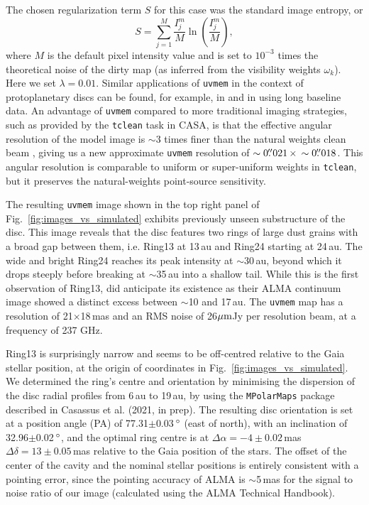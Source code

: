 \documentclass[fleqn,usenatbib,useAMS]{mnras}
\begin{document}
The chosen regularization term $S$ for this case was the standard image entropy, or
\begin{equation}
S = \sum_{j=1}^M \frac{I_j^m}{M} \ln\left(\frac{I_j^m}{M}\right),
\end{equation}
where $M$ is the default pixel intensity value and is set to $10^{-3}$ times the theoretical noise of the dirty map (as inferred from the visibility weights $\omega_k$). Here we set $\lambda = 0.01$. Similar applications of {\tt uvmem} in the context of protoplanetary discs can be found, for example, in \citet{Casassus2013Natur, 2018MNRAS.477.5104C, Casassus2019MNRAS.483.3278C,  Perez2019AJ....158...15P} and in \citet{2020ApJ...889L..24P} using long baseline data. An advantage of {\tt uvmem} compared to more traditional imaging strategies, such as provided by the  {\tt tclean} task in CASA, is that the effective angular resolution of the model image is $\sim$3 times finer than the natural weights clean beam \citep[][]{2018A&C....22...16C}, giving us a new approximate {\tt uvmem} resolution of $\sim0\hbox{$.\!\!^{\prime\prime}$}021 \,\times \,\sim0\hbox{$.\!\!^{\prime\prime}$}018$. This angular resolution is comparable to uniform or super-uniform weights in {\tt tclean}, but it preserves the natural-weights point-source sensitivity. 

The resulting {\tt uvmem} image shown in the top right panel of Fig.~\ref{fig:images_vs_simulated} exhibits previously unseen substructure of the disc. This image reveals that the disc features two rings of large dust grains with a broad gap between them, i.e. Ring13 at 13\,au and Ring24 starting at 24\,au. The wide and bright Ring24 reaches its peak intensity at $\sim$30\,au, beyond which it drops steeply before breaking at $\sim$35\,au into a shallow tail. While this is the first observation of Ring13, \citet{Ru_z_Rodr_guez_2019} did anticipate its existence as their ALMA continuum image showed a distinct excess between $\sim$10 and 17\,au. The {\tt uvmem} map has a resolution of 21$\times$18\,mas and an RMS noise of 26$\hbox{$\mu$m}$Jy per resolution beam, at a frequency of 237 GHz.  

Ring13 is surprisingly narrow and seems to be off-centred relative to the Gaia stellar position, at the origin of coordinates in Fig.~\ref{fig:images_vs_simulated}. We determined the ring's centre and orientation by minimising the dispersion of the disc radial profiles from 6\,au to 19\,au, by using the {\tt MPolarMaps} package described in Casassus et al. (2021, in prep). The resulting disc orientation is set at a position angle (PA) of 77.31$\pm$0.03\,$\hbox{$^\circ$}$ (east of north), with an  inclination of 32.96$\pm$0.02\,$\hbox{$^\circ$}$, and the optimal ring centre is at $\Delta \alpha = -4\pm0.02$\,mas $\Delta \delta = 13\pm0.05$\,mas relative to the Gaia position of the stars. The offset of the center of the cavity and the nominal stellar positions is entirely consistent with a pointing error, since the pointing accuracy of ALMA is $\sim$5\,mas for the signal to noise ratio of our image (calculated using the ALMA Technical Handbook).
\end{document}
